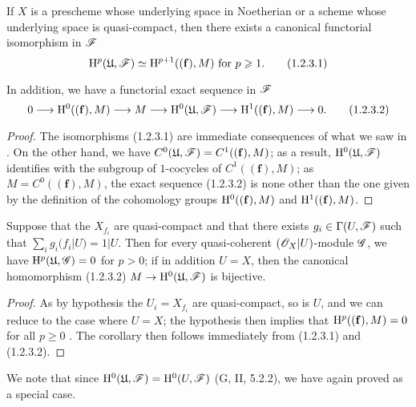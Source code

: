 \begin{prop}[1.2.3]
\label{3.1.2.3}
If $X$ is a prescheme whose underlying space in Noetherian or a scheme whose underlying space is quasi-compact, then there exists a canonical functorial isomorphism in $\mathscr{F}$
\[
  \mathrm{H}^p(\mathfrak{U},\mathscr{F})\simeq\mathrm{H}^{p+1}((\mathbf{f}),M)\text{ for }p\geqslant 1.
  \tag{1.2.3.1}
\]

In addition, we have a functorial exact sequence in $\mathscr{F}$
\[
  0\to\HH^0((\mathbf{f}),M)\to M\to\HH^0(\fk{U},\sh{F})\to\HH^1((\mathbf{f}),M)\to 0.
  \tag{1.2.3.2}
\]
\end{prop}

\begin{proof}
\label{proof-3.1.2.3}
The isomorphisms (1.2.3.1) are immediate consequences of what we saw in .
On the other hand, we have $C^0(\mathfrak{U},\mathscr{F})=C^1((\mathbf{f}),M)$; as a result, $\mathrm{H}^0(\mathfrak{U},\mathscr{F})$ identifies with the subgroup of $1$-cocycles of $C^1((\mathbf{f}),M)$; as $M=C^0((\mathbf{f}),M)$, the exact sequence (1.2.3.2) is none other than the one given by the definition of the cohomology groups $\mathrm{H}^0((\mathbf{f}),M)$ and $\mathrm{H}^1((\mathbf{f}),M)$.
\end{proof}

\begin{cor}[1.2.4]
\label{3.1.2.4}
Suppose that the $X_{f_i}$ are quasi-compact and that there exists $g_i\in\Gamma(U,\mathscr{F})$ such that $\sum_i g_i(f_i|U)=1|U$.
Then for every quasi-coherent $(\mathscr{O}_X|U)$-module $\mathscr{G}$, we have $\mathrm{H}^p(\mathfrak{U},\mathscr{G})=0$ for $p>0$; if in addition $U=X$, then the canonical homomorphism (1.2.3.2) $M\to\HH^0(\fk{U},\sh{F})$ is bijective.
\end{cor}

\begin{proof}
\label{proof-3.1.2.4}
As by hypothesis the $U_i=X_{f_i}$ are quasi-compact, so is $U$, and we can reduce to the case where $U=X$; the hypothesis then implies that $\mathrm{H}^p((\mathbf{f}),M)=0$ for all $p\geq 0$ .
The corollary then follows immediately from (1.2.3.1) and (1.2.3.2).
\end{proof}

We note that since $\mathrm{H}^0(\mathfrak{U},\mathscr{F})=\mathrm{H}^0(U,\mathscr{F})$ (G, II, 5.2.2), we have again proved  as a special case.

